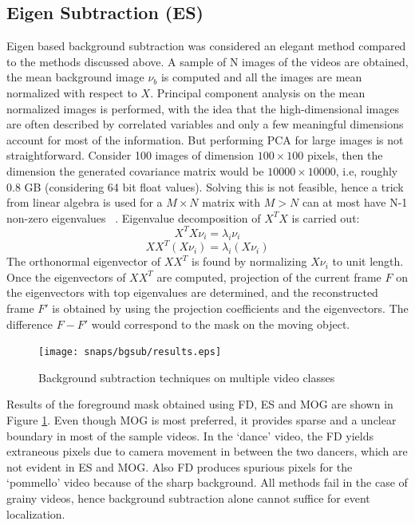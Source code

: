 \subsection{Eigen Subtraction (ES)}
Eigen based background subtraction was considered an elegant method compared to the methods discussed above.  A sample of N images of the videos are obtained, the mean background image $\nu_b$ is computed and all the images are mean normalized with respect to $X$.  Principal component analysis on the mean normalized images is performed, with the idea that the high-dimensional images are often described by correlated variables and only a few meaningful dimensions account for most of the information.  But performing PCA for large images is not straightforward. Consider 100 images of dimension $100 \times 100$ pixels, then the dimension the generated covariance matrix would be $10000 \times 10000$, i.e, roughly 0.8 GB (considering 64 bit float values). Solving this is not feasible, hence a trick from linear algebra is used for a $M  \times N$ matrix with $M>N$ can at most have N-1 non-zero eigenvalues ~\cite{Duda01}. Eigenvalue decomposition of $X^TX$ is carried out:
$$X^TX\nu_i=\lambda_i\nu_i$$
$$XX^T(X\nu_i)=\lambda_i(X\nu_i)$$
The orthonormal eigenvector of $XX^T$ is found by normalizing $X\nu_i$ to unit length.  Once the eigenvectors of $XX^T$  are computed, projection of the current frame $F$ on the eigenvectors with top eigenvalues are determined, and the reconstructed frame $F'$ is obtained by using the projection coefficients and the eigenvectors.  The difference $F-F'$ would correspond to the mask on the moving object.

\begin{figure}[htpb]
   \begin{center}
	    \texttt{[image: snaps/bgsub/results.eps]}     
     \caption {Background subtraction techniques on multiple video classes}
   \label{fig:bgsub}
   \end{center}
 \end{figure}
\par Results of the foreground mask obtained using FD, ES and MOG are shown in Figure \ref{fig:bgsub}. Even though MOG is most preferred, it provides sparse and a unclear boundary in most of the sample videos.  In the `dance' video, the FD yields extraneous pixels due to camera movement in between the two dancers, which are not evident in ES and MOG.  Also FD produces spurious pixels for the `pommello' video because of the sharp background.  All methods fail in the case of grainy videos, hence background subtraction alone cannot suffice for event localization.

